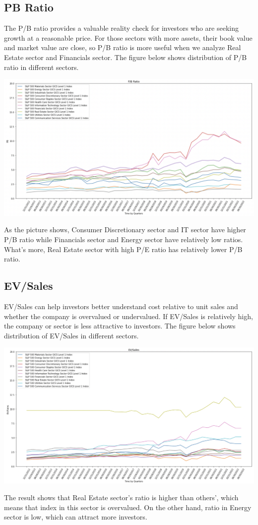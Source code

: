 \documentclass{article}
\begin{document}
\subsection{PB Ratio}
The P/B ratio provides a valuable reality check for investors who are seeking growth at a reasonable price. For those sectors with more assets, their book value and market value are close, so P/B ratio is more useful when we analyze Real Estate sector and Financials sector. The figure below shows distribution of P/B ratio in different sectors.
\begin{center}
    \includegraphics[scale=0.4]{PB_Ratio.png}
\end{center}
As the picture shows, Consumer Discretionary sector and IT sector have higher P/B ratio while Financials sector and Energy sector have relatively low ratios. What’s more, Real Estate sector with high P/E ratio has relatively lower P/B ratio.

\subsection{EV/Sales}
EV/Sales can help investors better understand cost relative to unit sales and whether the company is overvalued or undervalued. If EV/Sales is relatively high, the company or sector is less attractive to investors. The figure below shows distribution of EV/Sales in different sectors.
\begin{center}
    \includegraphics[scale=0.4]{EV2Sales.png}
\end{center}
The result shows that Real Estate sector’s ratio is higher than others’, which means that index in this sector is overvalued. On the other hand, ratio in Energy sector is low, which can attract more investors.
\end{document}
